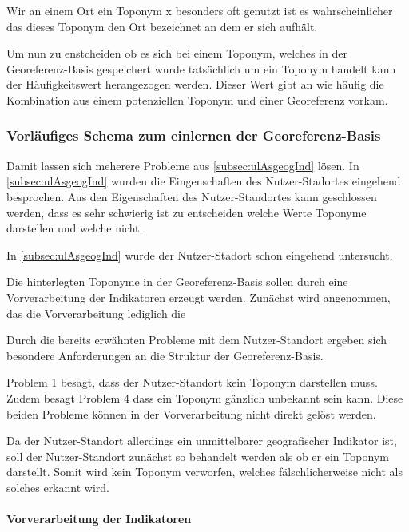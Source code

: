 						Wir an einem Ort ein Toponym x besonders oft genutzt ist es wahrscheinlicher das dieses Toponym den Ort bezeichnet an dem er sich aufhält. 



					Um nun zu enstcheiden ob es sich bei einem Toponym, welches in der Georeferenz-Basis gespeichert wurde tatsächlich um ein Toponym handelt kann der Häufigkeitswert herangezogen werden. 
					Dieser Wert gibt an wie häufig die Kombination aus einem potenziellen Toponym und einer Georeferenz vorkam.
					
 

					\subsubsection{Vorläufiges Schema zum einlernen der Georeferenz-Basis}

					Damit lassen sich meherere Probleme aus \ref{subsec:ulAsgeogInd} lösen.
					In \ref{subsec:ulAsgeogInd} wurden die Eingenschaften des Nutzer-Stadortes eingehend besprochen. 
					Aus den Eigenschaften des Nutzer-Standortes kann geschlossen werden, dass es sehr schwierig ist zu entscheiden welche Werte Toponyme darstellen und welche nicht.

					In \ref{subsec:ulAsgeogInd} wurde der Nutzer-Stadort schon eingehend untersucht. 


					Die hinterlegten Toponyme in der Georeferenz-Basis sollen durch eine Vorverarbeitung der Indikatoren erzeugt werden.
					Zunächst wird angenommen, das die Vorverarbeitung lediglich die 

					Durch die bereits erwähnten Probleme mit dem Nutzer-Standort ergeben sich besondere Anforderungen an die Struktur der Georeferenz-Basis.

					Problem 1 besagt, dass der Nutzer-Standort kein Toponym darstellen muss.
					Zudem besagt Problem 4 dass ein Toponym gänzlich unbekannt sein kann.
					Diese beiden Probleme können in der Vorverarbeitung nicht direkt gelöst werden.

					Da der Nutzer-Standort allerdings ein unmittelbarer geografischer Indikator ist, soll der Nutzer-Standort zunächst so behandelt werden als ob er ein 
					Toponym darstellt.
					Somit wird kein Toponym verworfen, welches fälschlicherweise nicht als solches erkannt wird. 



				  


				

					\paragraph{Vorverarbeitung der Indikatoren}  
						

